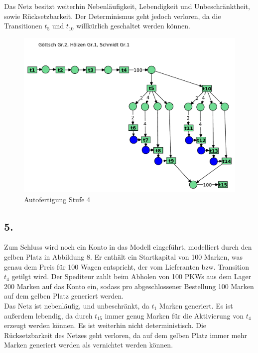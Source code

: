 \documentclass[12pt, paper=a4]{article}
\begin{document}
Das Netz besitzt weiterhin Nebenläufigkeit, Lebendigkeit und Unbeschränktheit, sowie Rücksetzbarkeit. Der Determinismus geht jedoch verloren, da die Transitionen $t_5$ und $t_10$ willkürlich geschaltet werden können.\\

\begin{figure}[h!]
\centering
\includegraphics[scale=0.7]{7-5-4.pdf}
\caption{Autofertigung Stufe 4}
\end{figure}

\newpage
\subsection*{5.}
Zum Schluss wird noch ein Konto in das Modell eingeführt, modelliert durch den gelben Platz in Abbildung 8. Er enthält ein Startkapital von 100 Marken, was genau dem Preis für 100 Wagen entspricht, der vom Lieferanten bzw. Transition $t_4$ getilgt wird. Der Spediteur zahlt beim Abholen von 100 PKWs aus dem Lager 200 Marken auf das Konto ein, sodass pro abgeschlossener Bestellung 100 Marken auf dem gelben Platz generiert werden.\\

Das Netz ist nebenläufig, und unbeschränkt, da $t_1$ Marken generiert. Es ist außerdem lebendig, da durch $t_15$ immer genug Marken für die Aktivierung von $t_4$ erzeugt werden können. Es ist weiterhin nicht deterministisch. Die Rücksetzbarkeit des Netzes geht verloren, da auf dem gelben Platz immer mehr Marken generiert werden als vernichtet werden können.\\
\end{document}
